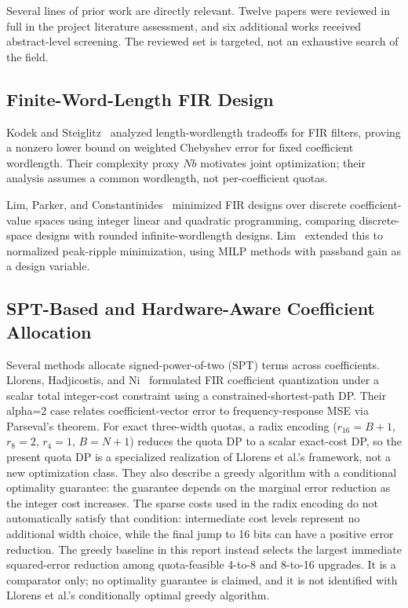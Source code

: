 
Several lines of prior work are directly relevant. Twelve papers were
reviewed in full in the project literature assessment, and six additional
works received abstract-level screening. The reviewed set is targeted,
not an exhaustive search of the field.

\subsection{Finite-Word-Length FIR Design}

Kodek and Steiglitz~\cite{kodek1980filter} analyzed length-wordlength
tradeoffs for FIR filters, proving a nonzero lower bound on weighted
Chebyshev error for fixed coefficient wordlength. Their complexity proxy
$Nb$ motivates joint optimization; their analysis assumes a common
wordlength, not per-coefficient quotas.

Lim, Parker, and Constantinides~\cite{lim1982finite} minimized FIR
designs over discrete coefficient-value spaces using integer linear and
quadratic programming, comparing discrete-space designs with rounded
infinite-wordlength designs. Lim~\cite{lim1990nprm} extended this to
normalized peak-ripple minimization, using MILP methods with passband
gain as a design variable.

\subsection{SPT-Based and Hardware-Aware Coefficient Allocation}

Several methods allocate signed-power-of-two (SPT) terms across
coefficients. Llorens, Hadjicostis, and Ni~\cite{llorens2005integercost}
formulated FIR coefficient quantization under a scalar total integer-cost
constraint using a constrained-shortest-path DP. Their alpha=2 case
relates coefficient-vector error to frequency-response MSE via Parseval's
theorem. For exact three-width quotas, a radix encoding
($r_{16}=B+1$, $r_8=2$, $r_4=1$, $B=N+1$) reduces the quota DP to a
scalar exact-cost DP, so the present quota DP is a specialized
realization of Llorens et al.'s framework, not a new optimization class.
They also describe a greedy algorithm with a conditional optimality
guarantee: the guarantee depends on the marginal error reduction as the
integer cost increases. The sparse costs used in the radix encoding do not
automatically satisfy that condition: intermediate cost levels represent no
additional width choice, while the final jump to 16 bits can have a positive
error reduction. The greedy baseline in this report instead selects the
largest immediate squared-error reduction among quota-feasible 4-to-8 and
8-to-16 upgrades. It is a comparator only; no optimality guarantee is
claimed, and it is not identified with Llorens et al.'s conditionally
optimal greedy algorithm.

